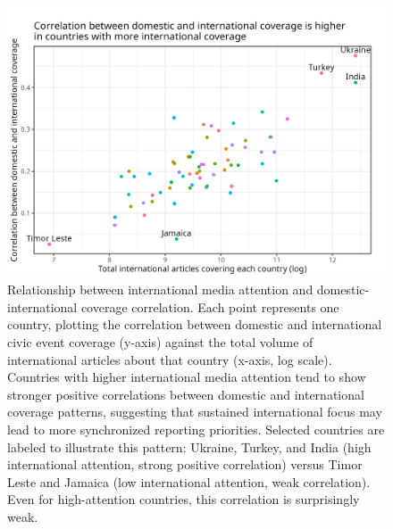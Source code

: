 \documentclass[
  letterpaper,
  DIV=11,
  numbers=noendperiod]{scrartcl}
\begin{document}
\begin{figure}

{\centering \includegraphics{source_comparison/figures/int_nat_corr_by_country.png}

}

\caption{\label{fig-int_nat_corr_by_country}Relationship between
international media attention and domestic-international coverage
correlation. Each point represents one country, plotting the correlation
between domestic and international civic event coverage (y-axis) against
the total volume of international articles about that country (x-axis,
log scale). Countries with higher international media attention tend to
show stronger positive correlations between domestic and international
coverage patterns, suggesting that sustained international focus may
lead to more synchronized reporting priorities. Selected countries are
labeled to illustrate this pattern: Ukraine, Turkey, and India (high
international attention, strong positive correlation) versus Timor Leste
and Jamaica (low international attention, weak correlation). Even for
high-attention countries, this correlation is surprisingly weak.}

\end{figure}
\end{document}
